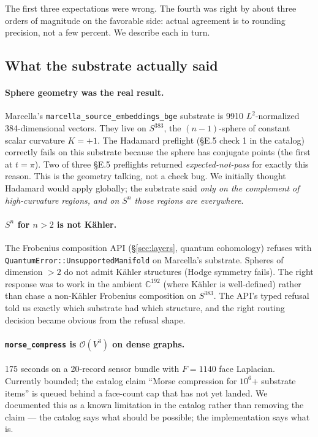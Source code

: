 \documentclass[11pt,letterpaper]{article}
\begin{document}
The first three expectations were wrong. The fourth was right by
about three orders of magnitude on the favorable side: actual
agreement is to rounding precision, not a few percent. We describe
each in turn.

\subsection{What the substrate actually said}

\paragraph{Sphere geometry was the real result.} Marcella's
\texttt{marcella\_source\_embeddings\_bge} substrate is 9910
$L^2$-normalized 384-dimensional vectors. They live on $S^{383}$, the
$(n-1)$-sphere of constant scalar curvature $K = +1$. The Hadamard
preflight (\S E.5 check 1 in the catalog) correctly fails on this
substrate because the sphere has conjugate points (the first at
$t = \pi$). Two of three \S E.5 preflights returned
\emph{expected-not-pass} for exactly this reason. This is the
geometry talking, not a check bug. We initially thought Hadamard
would apply globally; the substrate said \emph{only on the
complement of high-curvature regions, and on $S^n$ those regions are
everywhere}.

\paragraph{$S^n$ for $n > 2$ is not K\"ahler.} The Frobenius
composition API (\S\ref{sec:layers}, quantum cohomology) refuses with
\texttt{QuantumError::UnsupportedManifold} on Marcella's substrate.
Spheres of dimension $> 2$ do not admit K\"ahler structures (Hodge
symmetry fails). The right response was to work in the ambient
$\mathbb{C}^{192}$ (where K\"ahler is well-defined) rather than chase
a non-K\"ahler Frobenius composition on $S^{383}$. The API's typed
refusal told us exactly which substrate had which structure, and the
right routing decision became obvious from the refusal shape.

\paragraph{\texttt{morse\_compress} is $\mathcal{O}(V^3)$ on dense
graphs.} 175 seconds on a 20-record sensor bundle with $F = 1140$
face Laplacian. Currently bounded; the catalog claim ``Morse
compression for $10^6$+ substrate items'' is queued behind a
face-count cap that has not yet landed. We documented this as a
known limitation in the catalog rather than removing the claim --- the
catalog says what should be possible; the implementation says what
is.
\end{document}

